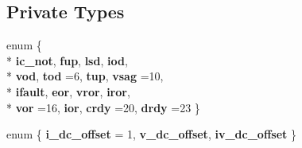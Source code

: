 \subsection*{Private Types}
\begin{DoxyCompactItemize}
\item 
enum \{ \\*
{\bfseries ic\-\_\-not}, 
{\bfseries fup}, 
{\bfseries lsd}, 
{\bfseries iod}, 
\\*
{\bfseries vod}, 
{\bfseries tod} =6, 
{\bfseries tup}, 
{\bfseries vsag} =10, 
\\*
{\bfseries ifault}, 
{\bfseries eor}, 
{\bfseries vror}, 
{\bfseries iror}, 
\\*
{\bfseries vor} =16, 
{\bfseries ior}, 
{\bfseries crdy} =20, 
{\bfseries drdy} =23
 \}
\item 
enum \{ {\bfseries i\-\_\-dc\-\_\-offset} = 1, 
{\bfseries v\-\_\-dc\-\_\-offset}, 
{\bfseries iv\-\_\-dc\-\_\-offset}
 \}
\end{DoxyCompactItemize}
